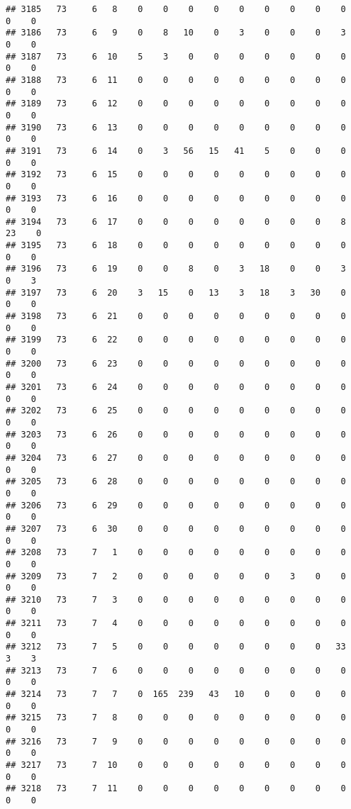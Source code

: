 \documentclass[]{article}
\begin{document}
\begin{verbatim}
## 3185   73     6   8    0    0    0    0    0    0    0    0    0    0    0
## 3186   73     6   9    0    8   10    0    3    0    0    0    3    0    0
## 3187   73     6  10    5    3    0    0    0    0    0    0    0    0    0
## 3188   73     6  11    0    0    0    0    0    0    0    0    0    0    0
## 3189   73     6  12    0    0    0    0    0    0    0    0    0    0    0
## 3190   73     6  13    0    0    0    0    0    0    0    0    0    0    0
## 3191   73     6  14    0    3   56   15   41    5    0    0    0    0    0
## 3192   73     6  15    0    0    0    0    0    0    0    0    0    0    0
## 3193   73     6  16    0    0    0    0    0    0    0    0    0    0    0
## 3194   73     6  17    0    0    0    0    0    0    0    0    8   23    0
## 3195   73     6  18    0    0    0    0    0    0    0    0    0    0    0
## 3196   73     6  19    0    0    8    0    3   18    0    0    3    0    3
## 3197   73     6  20    3   15    0   13    3   18    3   30    0    0    0
## 3198   73     6  21    0    0    0    0    0    0    0    0    0    0    0
## 3199   73     6  22    0    0    0    0    0    0    0    0    0    0    0
## 3200   73     6  23    0    0    0    0    0    0    0    0    0    0    0
## 3201   73     6  24    0    0    0    0    0    0    0    0    0    0    0
## 3202   73     6  25    0    0    0    0    0    0    0    0    0    0    0
## 3203   73     6  26    0    0    0    0    0    0    0    0    0    0    0
## 3204   73     6  27    0    0    0    0    0    0    0    0    0    0    0
## 3205   73     6  28    0    0    0    0    0    0    0    0    0    0    0
## 3206   73     6  29    0    0    0    0    0    0    0    0    0    0    0
## 3207   73     6  30    0    0    0    0    0    0    0    0    0    0    0
## 3208   73     7   1    0    0    0    0    0    0    0    0    0    0    0
## 3209   73     7   2    0    0    0    0    0    0    3    0    0    0    0
## 3210   73     7   3    0    0    0    0    0    0    0    0    0    0    0
## 3211   73     7   4    0    0    0    0    0    0    0    0    0    0    0
## 3212   73     7   5    0    0    0    0    0    0    0    0   33    3    3
## 3213   73     7   6    0    0    0    0    0    0    0    0    0    0    0
## 3214   73     7   7    0  165  239   43   10    0    0    0    0    0    0
## 3215   73     7   8    0    0    0    0    0    0    0    0    0    0    0
## 3216   73     7   9    0    0    0    0    0    0    0    0    0    0    0
## 3217   73     7  10    0    0    0    0    0    0    0    0    0    0    0
## 3218   73     7  11    0    0    0    0    0    0    0    0    0    0    0

\end{verbatim}
\end{document}
